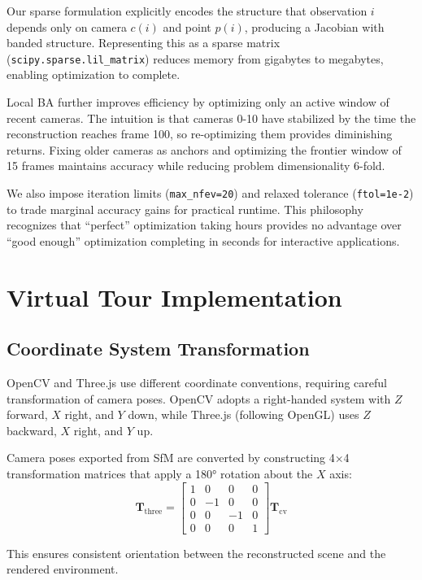 \documentclass[10pt,twocolumn,letterpaper]{article}
\begin{document}
Our sparse formulation explicitly encodes the structure that observation $i$ depends only on camera $c(i)$ and point $p(i)$, producing a Jacobian with banded structure. Representing this as a sparse matrix (\texttt{scipy.sparse.lil\_matrix}) reduces memory from gigabytes to megabytes, enabling optimization to complete.

Local BA further improves efficiency by optimizing only an active window of recent cameras. The intuition is that cameras 0-10 have stabilized by the time the reconstruction reaches frame 100, so re-optimizing them provides diminishing returns. Fixing older cameras as anchors and optimizing the frontier window of 15 frames maintains accuracy while reducing problem dimensionality 6-fold.

We also impose iteration limits (\texttt{max\_nfev=20}) and relaxed tolerance (\texttt{ftol=1e-2}) to trade marginal accuracy gains for practical runtime. This philosophy recognizes that ``perfect'' optimization taking hours provides no advantage over ``good enough'' optimization completing in seconds for interactive applications.

\section{Virtual Tour Implementation}

\subsection{Coordinate System Transformation}

OpenCV and Three.js use different coordinate conventions, requiring careful transformation of camera poses. OpenCV adopts a right-handed system with $Z$ forward, $X$ right, and $Y$ down, while Three.js (following OpenGL) uses $Z$ backward, $X$ right, and $Y$ up.

Camera poses exported from SfM are converted by constructing 4×4 transformation matrices that apply a 180° rotation about the $X$ axis:
\begin{equation}
\mathbf{T}_{\text{three}} = \begin{bmatrix}
1 & 0 & 0 & 0 \\
0 & -1 & 0 & 0 \\
0 & 0 & -1 & 0 \\
0 & 0 & 0 & 1
\end{bmatrix} \mathbf{T}_{\text{cv}}
\end{equation}

This ensures consistent orientation between the reconstructed scene and the rendered environment.
\end{document}
